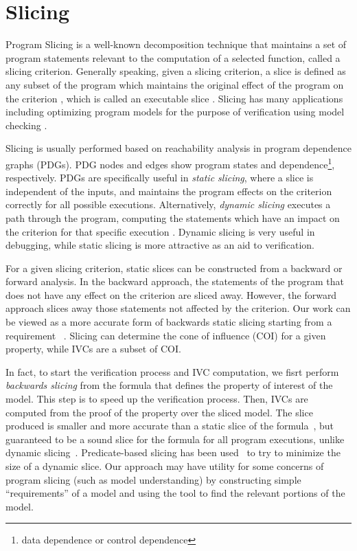 \section{Slicing}

Program  Slicing  is  a  well-known  decomposition  technique  that  maintains a
set of program statements  relevant to  the computation  of a  selected  function, called a slicing criterion. Generally speaking, given a slicing criterion, a slice is defined
 as any subset of the program which maintains the original effect of the program on the criterion \cite{Weiser97}, which is called an executable slice \cite{Androutsopoulos}.
  Slicing has many applications including optimizing program models
   for the purpose of verification using model checking \cite{Androutsopoulos, Jhala:2005, Dwyer:2006}.

Slicing is usually performed based on reachability analysis in program
dependence graphs (PDGs). PDG nodes and edges show program states and dependence\footnote{data dependence or control dependence}, respectively. PDGs are specifically useful in \emph{static slicing}, where
a slice is independent of the inputs,
 and maintains the program effects on the criterion
correctly for all possible executions. Alternatively,
\emph{dynamic slicing} executes a path through the program, computing the statements which have an impact on the criterion for that
specific execution \cite{Androutsopoulos}. Dynamic slicing is very useful in debugging, while static slicing is more attractive as an aid to verification.

For a given slicing criterion, static slices can be constructed from a backward or forward analysis. In the backward approach, the statements of the program that does not have any effect on the criterion are sliced away. However, the forward approach slices away those statements not affected by the criterion.
Our work can be viewed as a more accurate form of backwards static slicing starting from a requirement ~\cite{Tip95asurvey}. Slicing can determine the cone of influence (COI) for a given property, while IVCs are a subset of COI.

In fact, to start the verification process and IVC computation, we fisrt perform {\em backwards slicing} from the formula that defines the property of interest of the model. This step is to speed up the verification process.
 Then, IVCs are computed from the proof of the property over the sliced model.  The slice produced is smaller and more accurate than a static slice of the formula~\cite{Weiser:1981:slicing}, but guaranteed to be a sound slice for the formula for all program executions, unlike dynamic slicing~\cite{Agrawal:1990:slicing}.  Predicate-based slicing has been used~\cite{Li04:slicing} to try to minimize the size of a dynamic slice.  Our approach may have utility for some concerns of program slicing (such as model understanding) by constructing simple ``requirements'' of a model and using the tool to find the relevant portions of the model.


